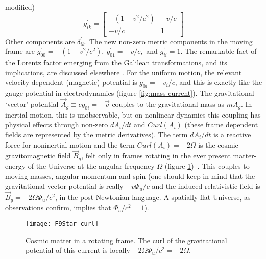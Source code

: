 \documentclass[aps,preprint,12pt,tightenlines]{revtex4}%
\begin{document}
modified)%
\begin{equation}
g_{ik}^{\prime}=%
\begin{bmatrix}
-\left(  1-v^{2}/c^{2}\right)  & -v/c\\
-v/c & 1
\end{bmatrix}
\end{equation}
Other components are $\delta_{ik}^{\prime}$. The new non-zero metric
components in the moving frame are $g_{00}^{\prime}=-(1-v^{2}/c^{2}%
),~g_{01}^{\prime}=-v/c,$ and $g_{ii}^{\prime}=1$. The remarkable fact of the Lorentz factor emerging from the Galilean transformations, and its implications, are discussed elsewhere \cite{Unni-Cosrel}. For the uniform motion, the relevant velocity dependent (magnetic) potential  is
$g_{0i}=-v_{i}/c$, and this is exactly like the gauge potential in
electrodynamics (figure \ref{fig:mass-current}). The gravitational `vector' potential $\vec{A}_{g}\equiv
cg_{0i}=-\vec{v}$ couples to the gravitational mass as $mA_{g}$. In inertial
motion, this is unobservable, but on nonlinear dynamics this coupling has
physical effects through non-zero $dA_{i}/dt$ and $Curl(A_{i})$ (these frame dependent fields are represented by the metric derivatives). The term
$dA_{i}/dt$ is a reactive force for noninertial motion and the term
$Curl(A_{i})=-2\Omega$ is the cosmic gravitomagnetic field $\vec{B}_{g}$, felt
only in frames rotating in the ever present matter-energy of the Universe at
the angular frequency $\Omega$ (figure \ref{fig:star-curl})~\cite{Unni-ISI}. This couples to moving masses,
angular momentum and spin (one should keep in mind that the gravitational
vector potential is really $-v\Phi_{u}/c$ and the induced relativistic field
is $\vec{B}_{g}=-2\Omega\Phi_{u}/c^{2}$, in the post-Newtonian language. A
spatially flat Universe, as observations confirm, implies that $\Phi_{u}%
/c^{2}=1$).

\begin{figure}
	\centering
	\texttt{[image: F9Star-curl]}
	\caption{Cosmic matter in a rotating frame. The curl of the gravitational potential of this current is locally $-2\Omega\Phi_{u}/c^{2}=-2\Omega$.}
	\label{fig:star-curl}
\end{figure}
\end{document}
